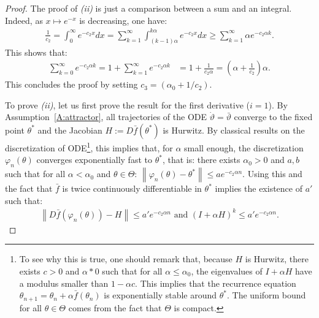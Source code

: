 \documentclass{article}
\newcommand\norm[1]{\left\|#1\right\|}
\begin{document}
\begin{proof}
    The proof of \emph{(ii)} is just a comparison between a sum and an integral. Indeed, as $x\mapsto e^{-x}$ is decreasing, one have:
    \begin{align*}
        \frac1{c_2} = \int_0^\infty e^{-c_2 x}dx =\sum_{k=1}^\infty \int_{(k-1)\alpha}^{k\alpha} e^{- c_2 x}dx \ge \sum_{k=1}^\infty \alpha e^{-c_2 \alpha k}.
    \end{align*}
    This shows that:
    \begin{align*}
        \sum_{k=0}^\infty e^{-c_2 \alpha k}  = 1 + \sum_{k=1}^\infty e^{-c_2 \alpha k}
        &= 1 + \frac1{c_2\alpha} = (\alpha+\frac1{c_2})\alpha.
    \end{align*}
    This concludes the proof by setting $c_3=(\alpha_0 + 1/c_2)$. 
    
    To prove \emph{(ii)}, let us first prove the result for the first derivative ($i=1$). By Assumption~\ref{A:attractor}, all trajectories of the ODE $\dot{\vartheta}=\bar{\vartheta}$ converge to the fixed point $\theta^*$ and the Jacobian $H := D\bar{f}(\theta^*)$ is Hurwitz. By classical results \cite{bof2018lyapunov} on the discretization of ODE\footnote{To see why this is true, one should remark that, because $H$ is Hurwitz, there exists $c>0$ and $\alpha*0$ such that for all $\alpha\le\alpha_0$, the eigenvalues of $I+\alpha H$ have a modulus smaller than $1-\alpha c$. This implies that the recurrence equation $\theta_{n+1}=\theta_n+\alpha \bar{f}(\theta_n)$ is exponentially stable around $\theta^*$. The uniform bound for all $\theta\in\Theta$ comes from the fact that $\Theta$ is compact.}, this implies that, for $\alpha$ small enough, the discretization $\varphi_n(\theta)$ converges exponentially fast to $\theta^*$, that is: there exists $\alpha_0>0$ and $a,b$ such that for all $\alpha<\alpha_0$ and $\theta\in\Theta$: $\norm{\varphi_n(\theta)-\theta^*}\le a e^{-c_2\alpha n}$. Using this and the fact that $\bar{f}$ is twice continuously differentiable in $\theta^*$ implies the existence of $a'$ such that:
    \begin{align}
        \norm{D\bar{f}(\varphi_n(\theta))-H}\le a' e^{-c_2\alpha n}\text{ and }(I+\alpha H)^{k}\le a'e^{-c_2\alpha n}.
    \end{align}
    

\end{proof}
\end{document}
